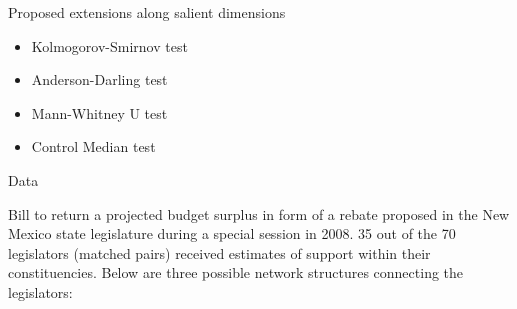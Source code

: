 \documentclass[final]{beamer}
\newlength{\onecolwid}
\newlength{\onecolwidd}
\begin{document}
\begin{frame}[t]
\begin{columns}[t]
\begin{column}{\onecolwidd}
\begin{block}{Proposed extensions along salient dimensions}
\begin{rmfamily}
\begin{itemize}
\begin{multicols}{2}
		\begin{itemize}
		\item Kolmogorov-Smirnov test
		\item Anderson-Darling test
		\item Mann-Whitney U test
		\item Control Median test
		\end{itemize}
		\end{multicols}
		\vspace*{.02in}
	\end{itemize}	

	\end{rmfamily}						
	\end{block}
	
	\vspace*{10mm}
	\begin{block}{Data}
	\begin{rmfamily}
	
	Bill to return a projected budget surplus in form of a rebate proposed in the New Mexico state legislature during a special session in 2008. 35 out of the 70 legislators (matched pairs) received estimates of support within their constituencies. Below are three possible network structures connecting the legislators:
	

\end{rmfamily}
\end{block}
\end{column}
\end{columns}
\end{frame}
\end{document}
